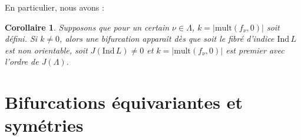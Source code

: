 \documentclass[a4paper,12pt,oneside,titlepage]{article}
\theoremstyle{definition}
\theoremstyle{plain}
\newtheorem{corollaire}[definition]{Corollaire}
\begin{document}
\noindent En particulier, nous avons :

\begin{corollaire}
Supposons que pour un certain $\nu \in \Lambda$, $k = |\mathrm{mult}(f_\nu, 0)|$ soit défini. Si $k \neq 0$, alors une bifurcation apparaît dès que soit le fibré d'indice $\mathrm{Ind}\, L$ est non orientable, soit $J(\mathrm{Ind}\, L) \neq 0$ et $k = |\mathrm{mult}(f_\nu, 0)|$ est premier avec l'ordre de $J(\Lambda)$.
\end{corollaire}


\part{Bifurcations équivariantes et symétries}

\cite{golubitsky1985sgb1}
\cite{golubitsky1988sgb2}
\cite{montaldi2021sbc}
\printbibliography
\end{document}
